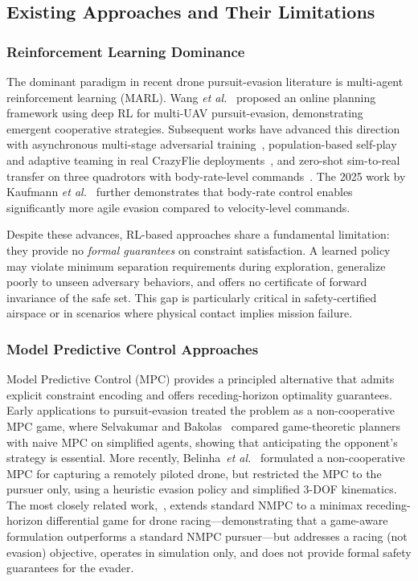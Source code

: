 \documentclass[lettersize,journal]{IEEEtran}
\theoremstyle{definition}
\theoremstyle{remark}
\begin{document}
\subsection{Existing Approaches and Their Limitations}

\subsubsection{Reinforcement Learning Dominance}
The dominant paradigm in recent drone pursuit-evasion literature is
multi-agent reinforcement learning (MARL).
Wang \emph{et al.}~\cite{wang2022game} proposed an online
planning framework using deep RL for multi-UAV pursuit-evasion,
demonstrating emergent cooperative strategies.
Subsequent works have advanced this direction with asynchronous
multi-stage adversarial training~\cite{gu2024learning},
population-based self-play and adaptive teaming in real
CrazyFlie deployments~\cite{lin2025adaptive}, and
zero-shot sim-to-real transfer on three quadrotors with
body-rate-level commands~\cite{zhang2024online}.
The 2025 work by Kaufmann \emph{et al.}~\cite{kaufmann2025learned}
further demonstrates that body-rate control enables significantly more
agile evasion compared to velocity-level commands.

Despite these advances, RL-based approaches share a fundamental
limitation: they provide no \emph{formal guarantees} on constraint
satisfaction.
A learned policy may violate minimum separation requirements during
exploration, generalize poorly to unseen adversary behaviors,
and offers no certificate of forward invariance of the safe set.
This gap is particularly critical in safety-certified airspace or
in scenarios where physical contact implies mission failure.

\subsubsection{Model Predictive Control Approaches}
Model Predictive Control (MPC) provides a principled alternative
that admits explicit constraint encoding and offers receding-horizon
optimality guarantees.
Early applications to pursuit-evasion treated the problem as a
non-cooperative MPC game, where Selvakumar and
Bakolas~\cite{selvakumar2021pursuit} compared game-theoretic planners
with naive MPC on simplified agents, showing that anticipating the
opponent's strategy is essential.
More recently, Belinha~\emph{et al.}~\cite{belinha2024noncooperative}
formulated a non-cooperative MPC for capturing a remotely piloted
drone, but restricted the MPC to the pursuer only, using a heuristic
evasion policy and simplified 3-DOF kinematics.
The most closely related work,~\cite{zhan2025nonlinear}, extends
standard NMPC to a minimax receding-horizon differential game for
drone racing---demonstrating that a game-aware formulation outperforms
a standard NMPC pursuer---but addresses a racing (not evasion)
objective, operates in simulation only, and does not provide
formal safety guarantees for the evader.
\end{document}
